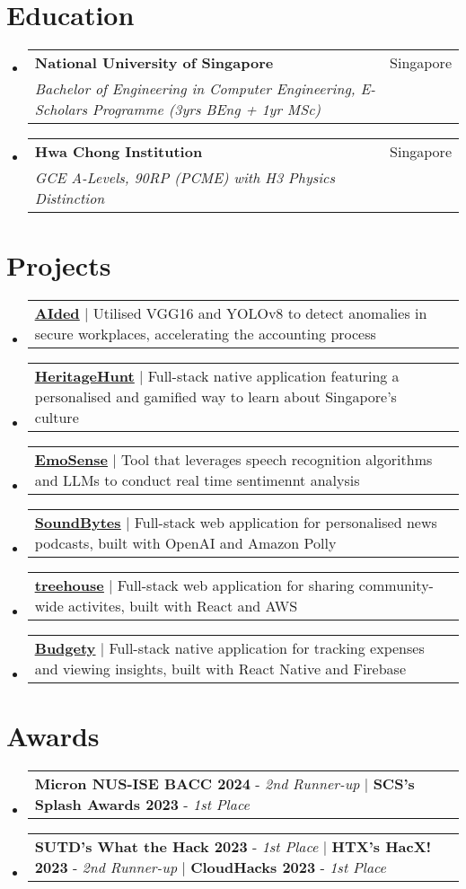 \documentclass[letterpaper,11pt]{article}
\makeatletter
\newcommand{\resumeItem}[1]{
  \item\small{
    {#1 \vspace{-2pt}}
  }
}
\newcommand{\resumeSubheading}[4]{
  \vspace{-2pt}\item
    \begin{tabular*}{0.97\textwidth}[t]{l@{\extracolsep{\fill}}r}
      \textbf{#1} & #2 \\
      \textit{\small#3} & \textit{\small #4} \\
    \end{tabular*}\vspace{-7pt}
}
\newcommand{\resumeProjectHeading}[2]{
    \item
    \begin{tabular*}{0.97\textwidth}{l@{\extracolsep{\fill}}r}
      \small#1 & #2 \\
    \end{tabular*}\vspace{-7pt}
}
\newcommand{\resumeSubHeadingListStart}{\begin{itemize}[leftmargin=0.15in, label={}]}
\newcommand{\resumeSubHeadingListEnd}{\end{itemize}}
\newcommand{\resumeItemListStart}{\begin{itemize}}
\newcommand{\resumeItemListEnd}{\end{itemize}\vspace{-5pt}}
\makeatother
\begin{document}
\section{Education}
  \resumeSubHeadingListStart
    \resumeSubheading
      {National University of Singapore}{Singapore}
      {Bachelor of Engineering in Computer Engineering, E-Scholars Programme (3yrs BEng + 1yr MSc)}{}
    \resumeSubheading
      {Hwa Chong Institution}{Singapore}
      {GCE A-Levels, 90RP (PCME) with H3 Physics Distinction}{}
  \resumeSubHeadingListEnd

\section{Projects}
  \resumeSubHeadingListStart
    \resumeProjectHeading
      {\textbf{\href{https://github.com/duckyfuz/accountingReID-hacX2023}{\underline{AIded}}} $|$ Utilised VGG16 and YOLOv8 to detect anomalies in secure workplaces, accelerating the accounting process}{}
    \resumeProjectHeading
      {\textbf{\href{https://github.com/duckyfuz/heritageHunt-SplashAwards2023}{\underline{HeritageHunt}}} $|$ Full-stack native application featuring a personalised and gamified way to learn about Singapore’s culture}{}
    \resumeProjectHeading
      {\textbf{\href{https://github.com/duckyfuz/emoSense-sutdwth2023}{\underline{EmoSense}}} $|$ Tool that leverages speech recognition algorithms and LLMs to conduct real time sentimennt analysis}{}
    \resumeProjectHeading
      {\textbf{\href{https://github.com/duckyfuz/soundBytes-cloudHacks2023}{\underline{SoundBytes}}} $|$ Full-stack web application for personalised news podcasts, built with OpenAI and Amazon Polly}{}
    \resumeProjectHeading
      {\textbf{\href{https://kenf.hashnode.dev/treehouse}{\underline{treehouse}}} $|$ Full-stack web application for sharing community-wide activites, built with React and AWS}{}
    \resumeProjectHeading
      {\textbf{\href{https://github.com/duckyfuz/expense_tracker}{\underline{Budgety}}} $|$ Full-stack native application for tracking expenses and viewing insights, built with React Native and Firebase}{}
  \resumeSubHeadingListEnd

\section{Awards}
  \resumeSubHeadingListStart
    \resumeProjectHeading
    {\textbf{Micron NUS-ISE BACC 2024} - \emph{2nd Runner-up} $|$ \textbf{SCS’s Splash Awards 2023} - \emph{1st Place}}{}
    \resumeProjectHeading
        {\textbf{SUTD's What the Hack 2023} - \emph{1st Place} $|$ \textbf{HTX's HacX! 2023} - \emph{2nd Runner-up} $|$ \textbf{CloudHacks 2023} - \emph{1st Place}}{}
  \resumeSubHeadingListEnd
\end{document}
